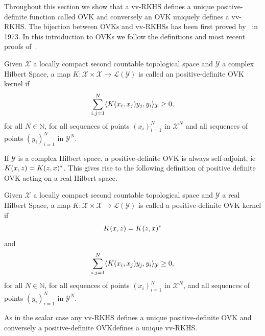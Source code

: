 Throughout this section we show that a \ac{vv-RKHS} defines a unique
po\-si\-ti\-ve-de\-fi\-ni\-te function called \acf{OVK} and conversely an
\ac{OVK} uniquely defines a \ac{vv-RKHS}. The bijection between \acsp{OVK} and
\acsp{vv-RKHS} has been first proved by~\citet{Senkene73} in 1973. In this
introduction to \acsp{OVK} we follow the definitions and most recent proofs
of~\citet{Carmeli2010}.
\begin{definition}
    \label{def:reproducing_kernel}
    Given $\mathcal{X}$ a locally compact second countable topological space
    and  $\mathcal{Y}$ a complex Hilbert Space, a map
    $K:\mathcal{X}\times\mathcal{X}\to\mathcal{L}(\mathcal{Y})$ is called an
    positive-definite \acl{OVK} kernel if
    \begin{dmath}
        \sum_{i,j=1}^N\inner{K(x_i,x_j)y_j,y_i}_{\mathcal{Y}}\ge 0,
    \end{dmath}
    for all $N\in\mathbb{N}$, for all sequences of points $(x_i)_{i=1}^N$ in
    $\mathcal{X}^N$ and all sequences of points $(y_i)_{i=1}^N$ in
    $\mathcal{Y}^N$. \label{def:ovk}
\end{definition}
If $\mathcal{Y}$ is a complex Hilbert space, a positive-definite \acl{OVK} is
always self-adjoint, \acs{ie}~$K(x,z)=K(z,x)^*$. This gives rise to the
following definition of positive definite \acl{OVK} acting on a real Hilbert
space.
\begin{definition}
    \label{def:reproducing_kernel_real} Given $\mathcal{X}$ a locally compact
    second countable topological space and $\mathcal{Y}$ a real Hilbert Space,
    a map $K:\mathcal{X}\times\mathcal{X}\to\mathcal{L}(\mathcal{Y})$ is called
    a positive-definite \acl{OVK} kernel if
    \begin{dmath}
        K(x,z)=K(z,x)^\adjoint
    \end{dmath}
    and
    \begin{dmath}
        \sum_{i,j=1}^N\inner{K(x_i,x_j)y_j,y_i}_{\mathcal{Y}}\ge 0,
    \end{dmath}
    for all $N\in\mathbb{N}$, for all sequences of points $(x_i)_{i=1}^N$ in
    $\mathcal{X}^N$, and all sequences of points  $(y_i)_{i=1}^N$ in
    $\mathcal{Y}^N$. \label{def:ovk_real}
\end{definition}
As in the scalar case any \acl{vv-RKHS} defines a unique positive-definite
\acl{OVK} and conversely a positive-definite \acl{OVK}defines a unique
\acl{vv-RKHS}.
